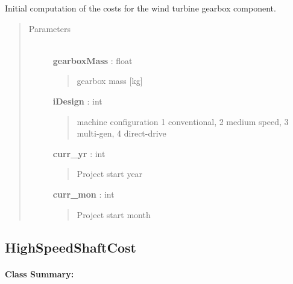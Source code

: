 \documentclass[letterpaper,10pt,openany,oneside]{sphinxmanual}
\begin{document}
\begin{fulllineitems}
\label{documentation:turbine_costSE.src.nacelle_costsSE.GearboxCost}
Initial computation of the costs for the wind turbine gearbox component.
\begin{quote}\begin{description}
\item[{Parameters }] \leavevmode\\
\textbf{gearboxMass} : float
\begin{quote}

gearbox mass {[}kg{]}
\end{quote}

\textbf{iDesign} : int
\begin{quote}

machine configuration 1 conventional, 2 medium speed, 3 multi-gen, 4 direct-drive
\end{quote}

\textbf{curr\_yr} : int
\begin{quote}

Project start year
\end{quote}

\textbf{curr\_mon} : int
\begin{quote}

Project start month
\end{quote}

\end{description}\end{quote}

\end{fulllineitems}



\subsection{HighSpeedShaftCost}
\label{documentation:highspeedshaftcost-class-label}\label{documentation:highspeedshaftcost}\paragraph{Class Summary:}
\end{document}
